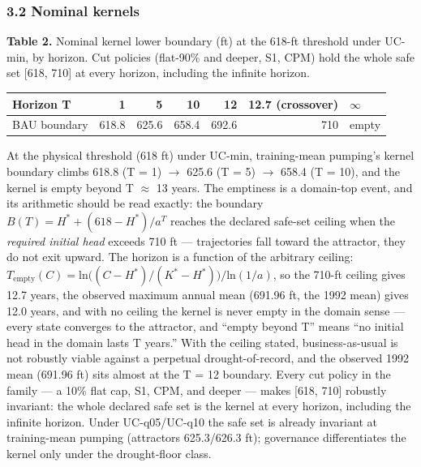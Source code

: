 \documentclass[11pt]{article}
\begin{document}
\subsubsection{3.2 Nominal kernels}\label{nominal-kernels}

\textbf{Table 2.} Nominal kernel lower boundary (ft) at the 618-ft
threshold under UC-min, by horizon. Cut policies (flat-90\% and deeper,
S1, CPM) hold the whole safe set {[}618, 710{]} at every horizon,
including the infinite horizon.

\begin{longtable}[]{@{}lrrrrrl@{}}
\toprule\noalign{}
Horizon T & 1 & 5 & 10 & 12 & 12.7 (crossover) & \ensuremath{\infty} \\
\midrule\noalign{}
\endhead
\bottomrule\noalign{}
\endlastfoot
BAU boundary & 618.8 & 625.6 & 658.4 & 692.6 & 710 & empty \\
\end{longtable}

At the physical threshold (618 ft) under UC-min, training-mean pumping's
kernel boundary climbs 618.8 (T = 1) \ensuremath{\rightarrow} 625.6 (T = 5) \ensuremath{\rightarrow} 658.4 (T = 10),
and the kernel is empty beyond T \ensuremath{\approx} 13 years. The emptiness is a
domain-top event, and its arithmetic should be read exactly: the
boundary \(B(T) = H^{\ast} + (618 - H^{\ast})/a^{T}\) reaches the
declared safe-set ceiling when the \emph{required initial head} exceeds
710 ft --- trajectories fall toward the attractor, they do not exit
upward. The horizon is a function of the arbitrary ceiling:
\(T_{\mathrm{empty}}(C) = \mathrm{ln}\bigl((C - H^{\ast})/(K^{\ast} - H^{\ast})\bigr)/\mathrm{ln}(1/a)\),
so the 710-ft ceiling gives 12.7 years, the observed maximum annual mean
(691.96 ft, the 1992 mean) gives 12.0 years, and with no ceiling the
kernel is never empty in the domain sense --- every state converges to
the attractor, and ``empty beyond T'' means ``no initial head in the
domain lasts T years.'' With the ceiling stated, business-as-usual is
not robustly viable against a perpetual drought-of-record, and the
observed 1992 mean (691.96 ft) sits almost at the T = 12 boundary. Every
cut policy in the family --- a 10\% flat cap, S1, CPM, and deeper ---
makes {[}618, 710{]} robustly invariant: the whole declared safe set is
the kernel at every horizon, including the infinite horizon. Under
UC-q05/UC-q10 the safe set is already invariant at training-mean pumping
(attractors 625.3/626.3 ft); governance differentiates the kernel only
under the drought-floor class.
\end{document}
